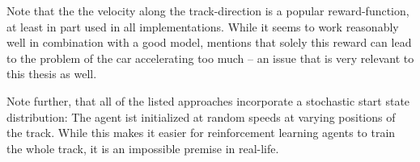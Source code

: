 Note that the the velocity along the track-direction is a popular reward-function, at least in part used in all implementations. While it seems to work reasonably well in combination with a good model, \cite{ben_lau_using_2016} mentions that solely this reward can lead to the problem of the car accelerating too much -- an issue that is very relevant to this thesis as well.

Note further, that all of the listed approaches incorporate a stochastic start state distribution: The agent ist initialized at random speeds at varying positions of the track. While this makes it easier for reinforcement learning agents to train the whole track, it is an impossible premise in real-life.